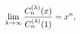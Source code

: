 \[\lim_{\lambda\to\infty}\frac{\mathop{C^{(\lambda)}_{n}\/}\nolimits\!\left(x%
\right)}{\mathop{C^{(\lambda)}_{n}\/}\nolimits\!\left(1\right)}=x^{n},\]